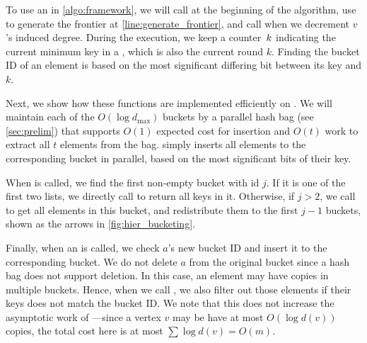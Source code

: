 To use an \HBS in \cref{algo:framework}, we will call  at the beginning of the algorithm, use \FGetNextBucket{} to generate the frontier at \cref{line:generate_frontier}, and call  when we decrement $v$'s induced degree. 
During the execution, we keep a counter~$k$ indicating the current minimum key in a \HBS{}, which is also the current round $k$.
Finding the bucket ID of an element is based on the most significant differing bit between its key and $k$.

Next, we show how these functions are implemented efficiently on \HBS{}.
We will maintain each of the $O(\log d_{\max})$ buckets by a parallel hash bag (see \cref{sec:prelim}) that supports $O(1)$ expected cost for insertion and $O(t)$ work to extract all $t$ elements from the bag.
\FBuildBuckets{} simply inserts all elements to the corresponding bucket in parallel, based on the most significant bits of their key.

When \FGetNextBucket{} is called, %
we find the first non-empty bucket with id $j$.
If it is one of the first two lists, we directly call \bagpack{} to return all keys in it.
Otherwise, %
if $j>2$, we call \bagpack{} to get all elements in this bucket, and redistribute them to the first $j-1$ buckets, 
shown as the arrows in \cref{fig:hier_bucketing}.

Finally, when an  is called, we check $a$'s new bucket ID and insert it to the corresponding bucket.  
We do not delete $a$ from the original bucket since a hash bag does not support deletion.
In this case, an element may have copies in multiple buckets. Hence, when we call \bagpack{}, 
we also filter out those elements if their keys does not match the bucket ID. 
We note that this does not increase the asymptotic work of \kcore{}---since a vertex $v$ may be have at most $O(\log d(v))$ copies, the total cost here is at most $\sum \log d(v)=O(m)$. 



